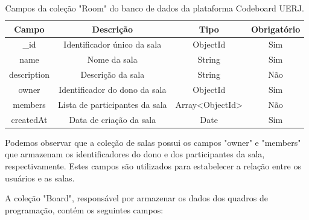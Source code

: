 \begin{table}[H]
    \centering
    \begin{tabular}{|c|c|c|c|}
        \hline
        \textbf{Campo} & \textbf{Descrição}             & \textbf{Tipo}   & \textbf{Obrigatório} \\
        \hline
        \_id           & Identificador único da sala    & ObjectId        & Sim                  \\
        name           & Nome da sala                   & String          & Sim                  \\
        description    & Descrição da sala              & String          & Não                  \\
        owner          & Identificador do dono da sala  & ObjectId        & Sim                  \\
        members        & Lista de participantes da sala & Array<ObjectId> & Não                  \\
        createdAt      & Data de criação da sala        & Date            & Sim                  \\
        \hline
    \end{tabular}
    \caption{Campos da coleção "Room" do banco de dados da plataforma Codeboard UERJ.}
    \label{tab:room-collection-fields}
\end{table}


Podemos observar que a coleção de salas possui os campos "owner" e "members" que armazenam os identificadores do dono e dos participantes da sala, respectivamente. Estes campos são utilizados para estabelecer a relação entre os usuários e as salas.

A coleção "Board", responsável por armazenar os dados dos quadros de programação, contém os seguintes campos:

